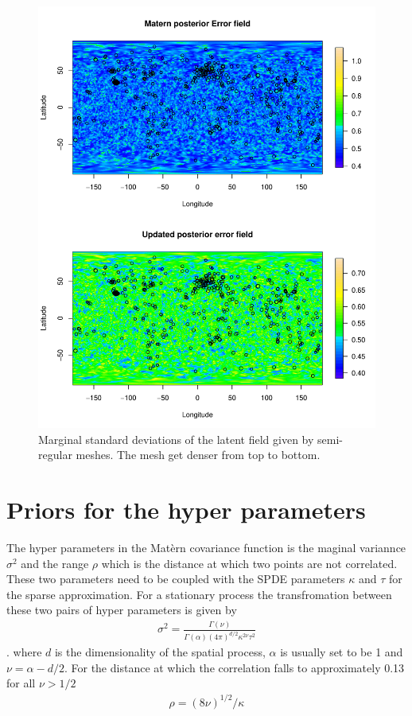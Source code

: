\documentclass[a4paper,12pt]{article}
\begin{document}
\begin{figure}[htbp]
 \begin{center}
 \includegraphics[scale=0.8]{fig/irreg_lMeshGIA_error_field.pdf}
 \end{center}
 \caption[Semi-regular mesh]{Marginal standard deviations of the latent field given by semi-regular meshes. The mesh get denser from top to bottom.}
 \label{fig:mesh_comp_hyper}
 \end{figure}
 
\section{Priors for the hyper parameters}\label{sec:hyperpar}
The hyper parameters in the Mat{\`e}rn covariance function is the maginal variannce $\sigma^2$ and the range $\rho$ which is the distance at which two points are not correlated. These two parameters need to be coupled with the SPDE parameters $\kappa$ and $\tau$ for the sparse approximation. For a stationary process the transfromation between these two pairs of hyper parameters is given by 
\begin{align}
\sigma^2 = \frac{\Gamma(\nu)}{\Gamma(\alpha)(4\pi)^{d/2}\kappa^{2\nu} \tau^{2}}
\end{align}. 
where $d$ is the dimensionality of the spatial process, $\alpha$ is usually set to be 1 and $\nu = \alpha -d/2$. For the distance at which the correlation falls to approximately 0.13 for all $\nu > 1/2$
\begin{align}
\rho = (8\nu)^{1/2}/\kappa
\end{align}
\end{document}
